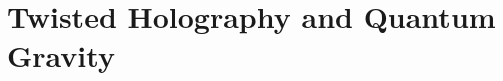 
\chapter{Twisted Holography and Quantum Gravity}

\providecommand{\Bbbk}{\mathbb{k}}
\providecommand{\HS}{\operatorname{HS}}
\providecommand{\wt}{\operatorname{wt}}
\providecommand{\CE}{\operatorname{CE}}
\providecommand{\End}{\operatorname{End}}
\providecommand{\Hom}{\operatorname{Hom}}
\providecommand{\Sym}{\operatorname{Sym}}
\providecommand{\id}{\mathrm{id}}
\providecommand{\Tr}{\operatorname{Tr}}
\providecommand{\Det}{\operatorname{Det}}
\providecommand{\Aut}{\operatorname{Aut}}
\providecommand{\Fred}{\operatorname{Fred}}
\providecommand{\Spec}{\operatorname{Spec}}
\providecommand{\Res}{\operatorname{Res}}
\providecommand{\rank}{\operatorname{rank}}
\providecommand{\ad}{\operatorname{ad}}
\providecommand{\Ainf}{\mathsf{A}_{\infty}}
\providecommand{\Linf}{L_\infty}
\providecommand{\PV}{\operatorname{PV}}
\providecommand{\RHom}{\operatorname{RHom}}
\providecommand{\BBar}{\operatorname{Bar}}
\providecommand{\Cobar}{\operatorname{\Omega}}
\providecommand{\barB}{\overline{B}}
\providecommand{\Diff}{\operatorname{Diff}}
\providecommand{\tr}{\operatorname{tr}}
\providecommand{\Zder}{\operatorname{Z}_{\mathrm{der}}}
\providecommand{\Abulk}{A_{\mathrm{bulk}}}
\providecommand{\Bbound}{B_{\partial}}
\providecommand{\sn}{\mathrm{SN}}
\providecommand{\hSym}{\widehat{\Sym}}
\providecommand{\lines}{\mathsf{Lines}}
\providecommand{\ModEnv}{\operatorname{ModEnv}}
\providecommand{\ohat}{\widehat{\otimes}}
\providecommand{\Mbar}{\overline{\mathcal M}}
\providecommand{\Perf}{\operatorname{Perf}}
\providecommand{\dCrit}{\operatorname{dCrit}}
\providecommand{\gr}{\operatorname{gr}}
\providecommand{\coker}{\operatorname{coker}}
\providecommand{\Spf}{\operatorname{Spf}}

%
%

